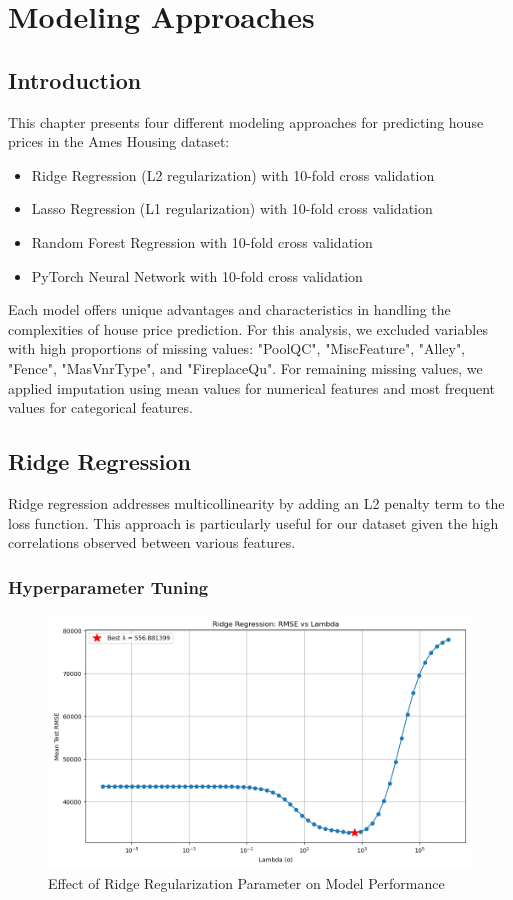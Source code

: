 \chapter{Modeling Approaches}

\section{Introduction}
This chapter presents four different modeling approaches for predicting house prices in the Ames Housing dataset:
\begin{itemize}
    \item Ridge Regression (L2 regularization) with 10-fold cross validation
    \item Lasso Regression (L1 regularization) with 10-fold cross validation
    \item Random Forest Regression with 10-fold cross validation
    \item PyTorch Neural Network with 10-fold cross validation
\end{itemize}

Each model offers unique advantages and characteristics in handling the complexities of house price prediction.
For this analysis, we excluded variables with high proportions of missing values: "PoolQC", "MiscFeature", "Alley", "Fence", "MasVnrType", and "FireplaceQu". For remaining missing values, we applied imputation using mean values for numerical features and most frequent values for categorical features.

\section{Ridge Regression}
Ridge regression addresses multicollinearity by adding an L2 penalty term to the loss function. This approach is particularly useful for our dataset given the high correlations observed between various features.

\subsection{Hyperparameter Tuning}

\begin{figure}[H]
    \centering
    \includegraphics[width=1.0\textwidth]{figures/ridge_lambda_vs_rmse.png}
    \caption{Effect of Ridge Regularization Parameter on Model Performance}
    \label{fig:ridge_lambda}
\end{figure}

